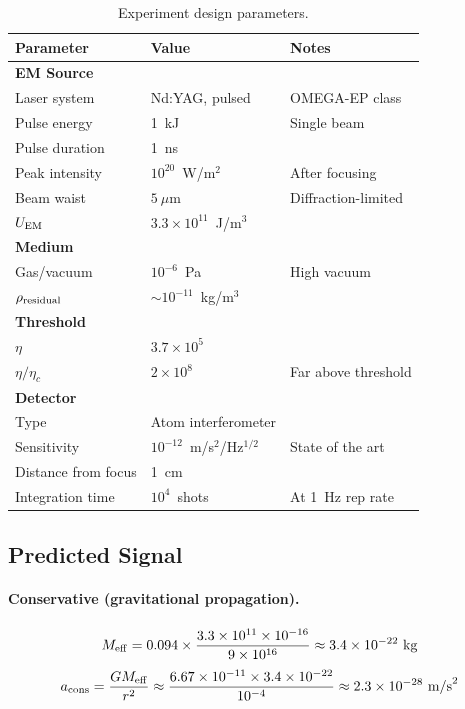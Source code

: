 \documentclass[12pt,a4paper]{article}
\begin{document}
\begin{table}[h]
\centering
\caption{Experiment design parameters.}
\label{tab:experiment}
\begin{tabular}{lll}
\toprule
Parameter & Value & Notes \\
\midrule
\textbf{EM Source} & & \\
\quad Laser system & Nd:YAG, pulsed & OMEGA-EP class \\
\quad Pulse energy & 1~kJ & Single beam \\
\quad Pulse duration & 1~ns & \\
\quad Peak intensity & $10^{20}$~W/m$^2$ & After focusing \\
\quad Beam waist & $5~\mu$m & Diffraction-limited \\
\quad $U_{\rm EM}$ & $3.3 \times 10^{11}$~J/m$^3$ & \\
\midrule
\textbf{Medium} & & \\
\quad Gas/vacuum & $10^{-6}$~Pa & High vacuum \\
\quad $\rho_{\rm residual}$ & $\sim 10^{-11}$~kg/m$^3$ & \\
\midrule
\textbf{Threshold} & & \\
\quad $\eta$ & $3.7 \times 10^5$ & \\
\quad $\eta/\eta_c$ & $2 \times 10^8$ & Far above threshold \\
\midrule
\textbf{Detector} & & \\
\quad Type & Atom interferometer & \\
\quad Sensitivity & $10^{-12}$~m/s$^2$/Hz$^{1/2}$ & State of the art \\
\quad Distance from focus & 1~cm & \\
\quad Integration time & $10^4$~shots & At 1~Hz rep rate \\
\bottomrule
\end{tabular}
\end{table}

\subsection{Predicted Signal}

\paragraph{Conservative (gravitational propagation).}
\begin{equation}
M_{\rm eff} = 0.094 \times \frac{3.3 \times 10^{11} \times 10^{-16}}{9 \times 10^{16}}
\approx 3.4 \times 10^{-22}~\text{kg}
\end{equation}
\begin{equation}
a_{\rm cons} = \frac{G M_{\rm eff}}{r^2}
\approx \frac{6.67 \times 10^{-11} \times 3.4 \times 10^{-22}}{10^{-4}}
\approx 2.3 \times 10^{-28}~\text{m/s}^2
\end{equation}
\end{document}

